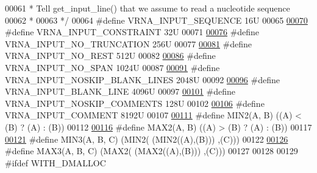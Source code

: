 \begin{DoxyCode}
00061 \textcolor{comment}{ *  Tell get\_input\_line() that we assume to read a nucleotide sequence}
00062 \textcolor{comment}{ * }
00063 \textcolor{comment}{ */}
00064 \textcolor{preprocessor}{#define VRNA\_INPUT\_SEQUENCE               16U}
00065 
\hyperlink{group__utils_gac08a9df45b9721b97a47dbfe7a6e5f85}{00070} \textcolor{preprocessor}{#define VRNA\_INPUT\_CONSTRAINT             32U}
00071 
\hyperlink{group__utils_ga086742158293217a46ae2f71bb296937}{00076} \textcolor{preprocessor}{#define VRNA\_INPUT\_NO\_TRUNCATION          256U}
00077 
\hyperlink{group__utils_ga7a2e8c50a0c7ce82e60da1016e1367fd}{00081} \textcolor{preprocessor}{#define VRNA\_INPUT\_NO\_REST                512U}
00082 
\hyperlink{group__utils_ga0de536599b881c787b0943a2671da476}{00086} \textcolor{preprocessor}{#define VRNA\_INPUT\_NO\_SPAN                1024U}
00087 
\hyperlink{group__utils_gab4db885222b3b69608310d7c7e63e286}{00091} \textcolor{preprocessor}{#define VRNA\_INPUT\_NOSKIP\_BLANK\_LINES     2048U}
00092 
\hyperlink{group__utils_ga305474b93ccb79ae4c7754016a8ddd84}{00096} \textcolor{preprocessor}{#define VRNA\_INPUT\_BLANK\_LINE             4096U}
00097 
\hyperlink{group__utils_ga0f6311f11bed1842e3a527ab27b294c6}{00101} \textcolor{preprocessor}{#define VRNA\_INPUT\_NOSKIP\_COMMENTS        128U}
00102 
\hyperlink{group__utils_gaf2062e0eeefffd3ed639af460b3d4fab}{00106} \textcolor{preprocessor}{#define VRNA\_INPUT\_COMMENT                8192U}
00107 
\hyperlink{group__utils_gae0b9cd0ce090bd69b951aa73e8fa4f7d}{00111} \textcolor{preprocessor}{#define MIN2(A, B)      ((A) < (B) ? (A) : (B))}
00112 
\hyperlink{group__utils_ga33297b3679c713b0c4d897cd0fe3b122}{00116} \textcolor{preprocessor}{#define MAX2(A, B)      ((A) > (B) ? (A) : (B))}
00117 
\hyperlink{group__utils_ga721b8d5f3abef17f10293f1f7f8c958e}{00121} \textcolor{preprocessor}{#define MIN3(A, B, C)   (MIN2(  (MIN2((A),(B))) ,(C)))}
00122 
\hyperlink{group__utils_ga8d577123d2e66d2b7d0bf9af6e172b93}{00126} \textcolor{preprocessor}{#define MAX3(A, B, C)   (MAX2(  (MAX2((A),(B))) ,(C)))}
00127 
00128 
00129 \textcolor{preprocessor}{#ifdef WITH\_DMALLOC}

\end{DoxyCode}
